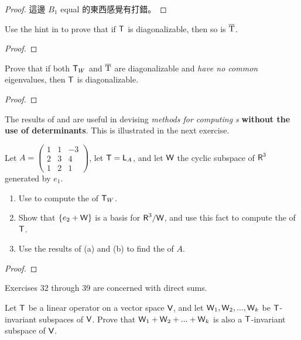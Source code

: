 \begin{proof}
這邊 \(B_1\) equal 的東西感覺有打錯。
\end{proof}

\begin{exercise} \label{exercise 5.4.29}
Use the hint in  to prove that if \(\textsf{T}\) is diagonalizable, then so is \(\mathrm{\overline{T}}\).
\end{exercise}

\begin{proof}
\end{proof}

\begin{exercise} \label{exercise 5.4.30}
Prove that if both \(\textsf{T}_W\) and \(\mathrm{\overline{T}}\) are diagonalizable and \emph{have no common} eigenvalues, then \(\textsf{T}\) is diagonalizable.
\end{exercise}

\begin{proof}
\end{proof}

The results of  and  are useful in devising \emph{methods for computing \CPOLY{}s} \textbf{without the use of determinants}.
This is illustrated in the next exercise.

\begin{exercise} \label{exercise 5.4.31}
Let \(A = \begin{pmatrix} 1 & 1 & -3 \\ 2 & 3 & 4 \\ 1 & 2 & 1 \end{pmatrix}\), let \(\textsf{T} = \textsf{L}_A\), and let \(\textsf{W}\) the cyclic subspace of \(\textsf{R}^3\) generated by \(e_1\).

\begin{enumerate}
\item Use  to compute the \CPOLY{} of \(\textsf{T}_W\).
\item Show that \(\{ e_2 + \textsf{W} \}\) is a basis for \(\textsf{R}^3/\textsf{W}\), and use this fact to compute the \CPOLY{} of \(\textsf{T}\).
\item Use the results of (a) and (b) to find the \CPOLY{} of \(A\).
\end{enumerate}
\end{exercise}

\begin{proof}
\end{proof}

Exercises 32 through 39 are concerned with direct sums.

\begin{exercise} \label{exercise 5.4.32}
Let \(\textsf{T}\) be a linear operator on a vector space \(\textsf{V}\), and let \(\textsf{W}_1, \textsf{W}_2 , ..., \textsf{W}_k\) be \(\textsf{T}\)-invariant subspaces of \(\textsf{V}\).
Prove that \(\textsf{W}_1 + \textsf{W}_2 + ... + \textsf{W}_k\) is also a \(\textsf{T}\)-invariant subspace of \(\textsf{V}\).
\end{exercise}

